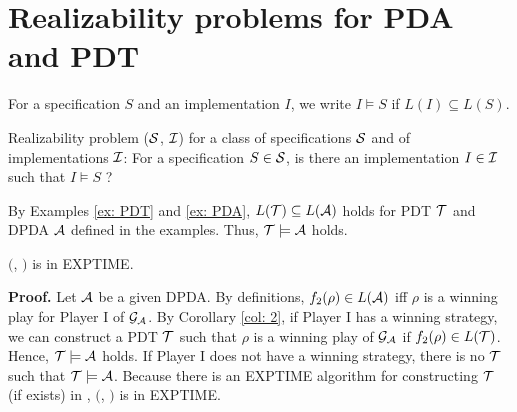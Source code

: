 \section{Realizability problems for PDA and PDT}
For a specification $S$ and an implementation $I$,
we write $I \models S$ if $L(I) \subseteq L(S)$.

\begin{definition}
Realizability problem \Real (${\cal S}$, ${\cal I}$) for a class of specifications ${\cal S}$ and of implementations ${\cal I}$: For a specification $S\in{\cal S}$, is there an implementation $I\in{\cal I}$ such that $I \models S$ ?
\end{definition}

\begin{example}
By Examples \ref{ex: PDT} and \ref{ex: PDA},
$L({\cal T})\subseteq L({\cal A})$ holds for PDT ${\cal T}$ and DPDA ${\cal A}$
defined in the examples.
Thus, ${\cal T}\models{\cal A}$ holds.
\end{example}

\begin{theorem}\label{the: DPDA}
\Real $($\DPDA, \PDT$)$ is in EXPTIME.
\end{theorem}
{\bf Proof.}\quad
Let ${\cal A}$ be a given DPDA.
By definitions, $f_2(\rho)\in L({\cal A})$ iff
$\rho$ is a winning play for Player I of ${\cal G}_{\cal A}$.
By Corollary \ref{col: 2},
if Player I has a winning strategy,
we can construct a PDT ${\cal T}$ such that
$\rho$ is a winning play of ${\cal G}_{\cal A}$ if $f_2(\rho)\in L({\cal T})$.
Hence, ${\cal T}\models{\cal A}$ holds.
If Player I does not have a winning strategy, there is no ${\cal T}$ such that ${\cal T} \models {\cal A}$.
Because there is an EXPTIME algorithm for constructing ${\cal T}$ (if exists)
in \cite{Wa96}, \Real $($\DPDA, \PDT$)$ is in EXPTIME.

